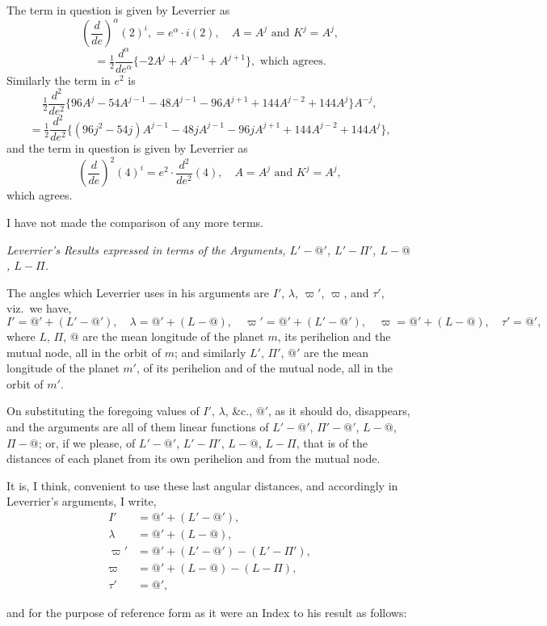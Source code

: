 \documentclass[11pt,a4paper]{article}
\theoremstyle{plain}
\theoremstyle{definition}
\theoremstyle{remark}
\begin{document}
\newpage

The term in question is given by Leverrier as
\[
\left(\frac{d}{de}\right)^{\alpha}(2)^{i}, = e^{\alpha}\cdot i(2), \quad A=A^{j} \text{ and } K^{j}=A^{j},
\]
\[=
\tfrac12\frac{d^{\alpha}}{de^{\alpha}}\{-2A^{j}+A^{j-1}+A^{j+1}\}, \text{ which agrees.}
\]
Similarly the term in $e^{2}$ is
\[
\tfrac12\frac{d^{2}}{de^{2}}\{96A^{j}-54A^{j-1}-48A^{j-1}-96A^{j+1}+144A^{j-2}+144A^{j}\}A^{-j},
\]
\[=
\tfrac12\frac{d^{2}}{de^{2}}\{(96j^{2}-54j)A^{j-1}-48jA^{j-1}-96jA^{j+1}+144A^{j-2}+144A^{j}\},
\]
and the term in question is given by Leverrier as
\[
\left(\frac{d}{de}\right)^{2}(4)^{i}=e^{2}\cdot\frac{d^{2}}{de^{2}}(4), \quad A=A^{j} \text{ and } K^{j}=A^{j},
\]
which agrees.

I have not made the comparison of any more terms.

\begin{center}
\textit{Leverrier's Results expressed in terms of the Arguments, $L'-@'$, $L'-\Pi'$, $L-@$, $L-\Pi$.}
\end{center}

The angles which Leverrier uses in his arguments are $I'$, $\lambda$, $\varpi'$, $\varpi$, and $\tau'$, viz.\ we have,
\[
I' = @'+(L'-@'), \quad \lambda=@'+(L-@), \quad \varpi'=@'+(L'-@'), \quad \varpi=@'+(L-@), \quad \tau'=@',
\]
where $L$, $\Pi$, $@$ are the mean longitude of the planet $m$, its perihelion and the mutual node, all in the orbit of $m$; and similarly $L'$, $\Pi'$, $@'$ are the mean longitude of the planet $m'$, of its perihelion and of the mutual node, all in the orbit of $m'$.

On substituting the foregoing values of $I'$, $\lambda$, \&c., $@'$, as it should do, disappears, and the arguments are all of them linear functions of $L'-@'$, $\Pi'-@'$, $L-@$, $\Pi-@$; or, if we please, of $L'-@'$, $L'-\Pi'$, $L-@$, $L-\Pi$, that is of the distances of each planet from its own perihelion and from the mutual node.

It is, I think, convenient to use these last angular distances, and accordingly in Leverrier's arguments, I write,
\begin{align*}
I'&=@'+(L'-@'),\\
\lambda&=@'+(L-@),\\
\varpi'&=@'+(L'-@')-(L'-\Pi'),\\
\varpi&=@'+(L-@)-(L-\Pi),\\
\tau'&=@',
\end{align*}

and for the purpose of reference form as it were an Index to his result as follows:
\end{document}
